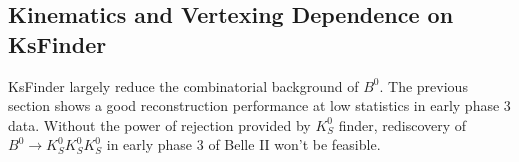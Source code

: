\subsection{Kinematics and Vertexing Dependence on KsFinder} 

KsFinder largely reduce the combinatorial background of $B^0$. The previous section shows a good reconstruction performance at low statistics in early phase 3 data. Without the power of rejection provided by $K_S^0$ finder, rediscovery of $B^0 \to K_S^0  K_S^0  K_S^0$ in early phase 3 of Belle II won't be feasible. 

